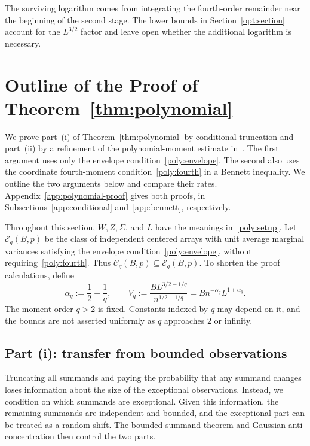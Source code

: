\documentclass[11pt,letterpaper]{article}
\newenvironment{recovered}{}{}
\theoremstyle{remark}
\begin{document}
The surviving logarithm comes from integrating the fourth-order
remainder near the beginning of the second stage. The lower bounds in
Section~\ref{opt:section} account for the \(L^{3/2}\) factor and leave
open whether the additional logarithm is necessary.

\section{Outline of the Proof of Theorem~\ref*{thm:polynomial}}\label{sec:poly}

\begin{recovered}
We prove part~\textup{(i)} of Theorem~\ref{thm:polynomial} by
conditional truncation and part~\textup{(ii)} by a refinement of the
polynomial-moment estimate in~\cite{CCKK2022}. The first argument
uses only the envelope condition~\eqref{poly:envelope}. The second
also uses the coordinate fourth-moment condition~\eqref{poly:fourth}
in a Bennett inequality. We outline the two arguments below and
compare their rates. Appendix~\ref{app:polynomial-proof} gives
both proofs, in Subsections~\ref{app:conditional}
and~\ref{app:bennett}, respectively.
\end{recovered}

Throughout this section, \(W,Z,\Sigma\), and \(L\) have the meanings
in~\eqref{poly:setup}. Let \(\mathcal E_q(B,p)\) be the class of
independent centered arrays with unit average marginal variances
satisfying the envelope condition~\eqref{poly:envelope}, without
requiring~\eqref{poly:fourth}. Thus
\(\mathcal C_q(B,p)\subseteq\mathcal E_q(B,p)\).
To shorten the proof calculations, define
\begin{equation}
 \alpha_q:=\frac12-\frac1q,\qquad
 V_q:=\frac{B L^{3/2-1/q}}{n^{1/2-1/q}}
      =Bn^{-\alpha_q}L^{1+\alpha_q}.
 \label{poly:rates}
\end{equation}
The moment order \(q>2\) is fixed. Constants indexed by \(q\)
may depend on it, and the bounds are not asserted uniformly as
\(q\) approaches \(2\) or infinity.

\subsection{\texorpdfstring{{Part (i): transfer from bounded observations}}{Part (i): transfer from bounded observations}}\label{poly:transfer-sec}

Truncating all {summands} and paying the probability that any {summand} changes
loses information about the size of the exceptional observations.
Instead, we condition on which {summands} are exceptional. Given this
information, the remaining {summands} are independent and bounded, and the
exceptional part can be treated as a random shift. The bounded-summand
theorem and Gaussian anti-concentration then control the two parts.
\end{document}
